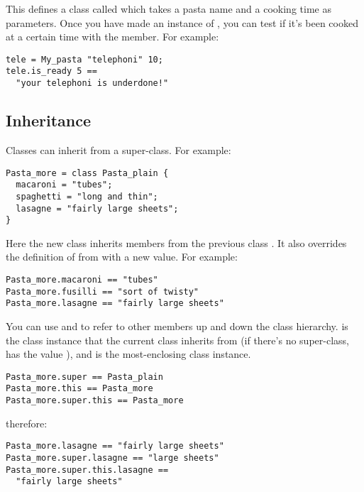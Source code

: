 \noindent
This defines a class called  which takes a pasta name
and a cooking time as parameters. Once you have made an instance of
, you can test if it's been cooked at a certain time with the
 member. For example:

\begin{verbatim}
tele = My_pasta "telephoni" 10;
tele.is_ready 5 == 
  "your telephoni is underdone!"
\end{verbatim}

\subsection{Inheritance}

Classes can inherit from a super-class. For example:

\begin{verbatim}
Pasta_more = class Pasta_plain { 
  macaroni = "tubes";
  spaghetti = "long and thin";
  lasagne = "fairly large sheets";
}
\end{verbatim}

\noindent
Here the new class  inherits members from the previous class
. It also overrides the definition of  from
 with a new value. For example:

\begin{verbatim}
Pasta_more.macaroni == "tubes"
Pasta_more.fusilli == "sort of twisty"
Pasta_more.lasagne == "fairly large sheets"
\end{verbatim}

You can use  and
 to refer to other members up and down the class hierarchy.
 is the class instance that the current class inherits from (if
there's no super-class,  has the value \ct{[]}), and
 is the most-enclosing class instance. 

\begin{verbatim}
Pasta_more.super == Pasta_plain
Pasta_more.this == Pasta_more
Pasta_more.super.this == Pasta_more 
\end{verbatim}

\noindent
therefore:

\begin{verbatim}
Pasta_more.lasagne == "fairly large sheets"
Pasta_more.super.lasagne == "large sheets"
Pasta_more.super.this.lasagne ==
  "fairly large sheets" 
\end{verbatim}

